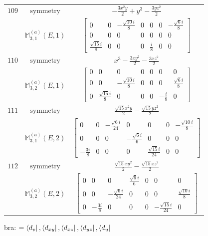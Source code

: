\documentclass[fleqn,8pt,landscape]{jsarticle}
\begin{document}
\begin{longtable}{ccc}
$ 109 $ & $ \text{symmetry} $ & $ - \frac{3 x^{2} y}{2} + y^{3} - \frac{3 y z^{2}}{2} $ \\
$  $ & $ \mathbb{M}_{3,1}^{(a)}(E,1) $ & $ \begin{bmatrix} 0 & 0 & - \frac{\sqrt{10} i}{8} & 0 & 0 & 0 & - \frac{\sqrt{6} i}{8} \\ 0 & 0 & 0 & 0 & 0 & 0 & 0 \\ \frac{\sqrt{15} i}{8} & 0 & 0 & 0 & \frac{i}{8} & 0 & 0 \end{bmatrix} $ \\ \hline
$ 110 $ & $ \text{symmetry} $ & $ x^{3} - \frac{3 x y^{2}}{2} - \frac{3 x z^{2}}{2} $ \\
$  $ & $ \mathbb{M}_{3,2}^{(a)}(E,1) $ & $ \begin{bmatrix} 0 & 0 & 0 & 0 & 0 & 0 & 0 \\ 0 & 0 & - \frac{\sqrt{10} i}{8} & 0 & 0 & 0 & \frac{\sqrt{6} i}{8} \\ 0 & \frac{\sqrt{15} i}{8} & 0 & 0 & 0 & - \frac{i}{8} & 0 \end{bmatrix} $ \\ \hline
$ 111 $ & $ \text{symmetry} $ & $ \frac{\sqrt{15} x^{2} y}{2} - \frac{\sqrt{15} y z^{2}}{2} $ \\
$  $ & $ \mathbb{M}_{3,1}^{(a)}(E,2) $ & $ \begin{bmatrix} 0 & 0 & - \frac{\sqrt{6} i}{24} & 0 & 0 & 0 & - \frac{\sqrt{10} i}{8} \\ 0 & 0 & 0 & - \frac{\sqrt{6} i}{6} & 0 & 0 & 0 \\ - \frac{3 i}{8} & 0 & 0 & 0 & \frac{\sqrt{15} i}{24} & 0 & 0 \end{bmatrix} $ \\ \hline
$ 112 $ & $ \text{symmetry} $ & $ \frac{\sqrt{15} x y^{2}}{2} - \frac{\sqrt{15} x z^{2}}{2} $ \\
$  $ & $ \mathbb{M}_{3,2}^{(a)}(E,2) $ & $ \begin{bmatrix} 0 & 0 & 0 & \frac{\sqrt{6} i}{6} & 0 & 0 & 0 \\ 0 & 0 & - \frac{\sqrt{6} i}{24} & 0 & 0 & 0 & \frac{\sqrt{10} i}{8} \\ 0 & - \frac{3 i}{8} & 0 & 0 & 0 & - \frac{\sqrt{15} i}{24} & 0 \end{bmatrix} $ \\ \hline
\end{longtable}
bra: $=\bra{d_{v}}, \bra{d_{xy}}, \bra{d_{xz}}, \bra{d_{yz}}, \bra{d_{u}}$
\end{document}

